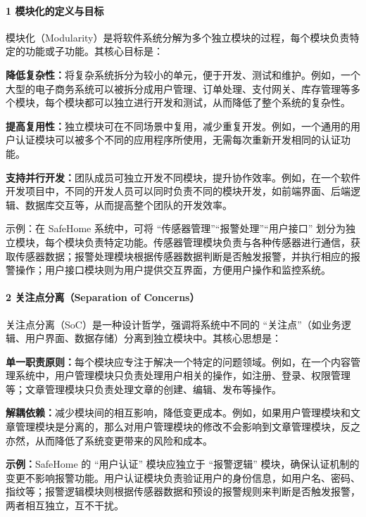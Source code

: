\paragraph{1 模块化的定义与目标}\label{ux6a21ux5757ux5316ux7684ux5b9aux4e49ux4e0eux76eeux6807}

模块化（Modularity）是将软件系统分解为多个独立模块的过程，每个模块负责特定的功能或子功能。其核心目标是：

\textbf{降低复杂性：}将复杂系统拆分为较小的单元，便于开发、测试和维护。例如，一个大型的电子商务系统可以被拆分成用户管理、订单处理、支付网关、库存管理等多个模块，每个模块都可以独立进行开发和测试，从而降低了整个系统的复杂性。

\textbf{提高复用性：}独立模块可在不同场景中复用，减少重复开发。例如，一个通用的用户认证模块可以被多个不同的应用程序所使用，无需每次重新开发相同的认证功能。

\textbf{支持并行开发：}团队成员可独立开发不同模块，提升协作效率。例如，在一个软件开发项目中，不同的开发人员可以同时负责不同的模块开发，如前端界面、后端逻辑、数据库交互等，从而提高整个团队的开发效率。

示例：在 SafeHome 系统中，可将 ``传感器管理''``报警处理''``用户接口'' 划分为独立模块，每个模块负责特定功能。传感器管理模块负责与各种传感器进行通信，获取传感器数据；报警处理模块根据传感器数据判断是否触发报警，并执行相应的报警操作；用户接口模块则为用户提供交互界面，方便用户操作和监控系统。

\paragraph{2 关注点分离（Separation of Concerns）}\label{ux5173ux6ce8ux70b9ux5206ux79bbseparation-of-concerns}

关注点分离（SoC）是一种设计哲学，强调将系统中不同的 ``关注点''（如业务逻辑、用户界面、数据存储）分离到独立模块中。其核心思想是：

\textbf{单一职责原则：}每个模块应专注于解决一个特定的问题领域。例如，在一个内容管理系统中，用户管理模块只负责处理用户相关的操作，如注册、登录、权限管理等；文章管理模块只负责处理文章的创建、编辑、发布等操作。

\textbf{解耦依赖：}减少模块间的相互影响，降低变更成本。例如，如果用户管理模块和文章管理模块是分离的，那么对用户管理模块的修改不会影响到文章管理模块，反之亦然，从而降低了系统变更带来的风险和成本。

\textbf{示例：}SafeHome 的 ``用户认证'' 模块应独立于 ``报警逻辑'' 模块，确保认证机制的变更不影响报警功能。用户认证模块负责验证用户的身份信息，如用户名、密码、指纹等；报警逻辑模块则根据传感器数据和预设的报警规则来判断是否触发报警，两者相互独立，互不干扰。

